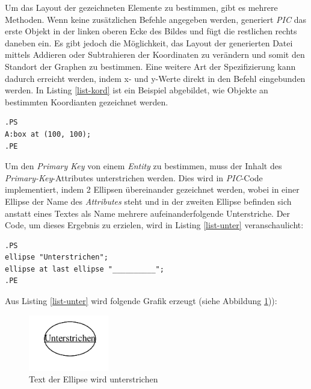 \pra
\noindent
Um das Layout der gezeichneten Elemente zu bestimmen, gibt es mehrere Methoden. Wenn keine zusätzlichen Befehle angegeben werden, generiert \textit{PIC} das erste Objekt in der linken oberen Ecke des Bildes und fügt die restlichen rechts daneben ein. Es gibt jedoch die Möglichkeit, das Layout der generierten Datei mittels Addieren oder Subtrahieren der Koordinaten zu verändern und somit den Standort der Graphen zu bestimmen. Eine weitere Art der Spezifizierung kann dadurch erreicht werden, indem x- und y-Werte direkt in den Befehl eingebunden werden. In Listing \ref{list-kord} ist ein Beispiel abgebildet, wie Objekte an bestimmten Koordianten gezeichnet werden.
\\

\noindent
\lstset{frame=lines}
\lstset{basicstyle=\footnotesize}
\begin{lstlisting}
.PS
A:box at (100, 100);
.PE
\end{lstlisting}

\noindent
Um den \textit{Primary Key} von einem \textit{Entity} zu bestimmen, muss der Inhalt des \textit{Primary-Key}-Attributes unterstrichen werden. Dies wird in \textit{PIC}-Code implementiert, indem 2 Ellipsen übereinander gezeichnet werden, wobei in einer Ellipse der Name des \textit{Attributes} steht und in der zweiten Ellipse befinden sich anstatt eines Textes als Name mehrere aufeinanderfolgende Unterstriche. Der Code, um dieses Ergebnis zu erzielen, wird in Listing \ref{list-unter} veranschaulicht:
\pra
\lstset{frame=lines}
\lstset{caption={PIC-Code zum Unterstreichen von Text in einer Ellipse]}}
\lstset{basicstyle=\footnotesize}
\begin{lstlisting}
.PS
ellipse "Unterstrichen";
ellipse at last ellipse "__________";
.PE
\end{lstlisting}

\noindent
Aus Listing \ref{list-unter} wird folgende Grafik erzeugt (siehe Abbildung \ref{Unterstrichen})):

\noindent
\begin{figure}[H]
	\begin{center}
		\includegraphics[width=3.5cm]{images/Ellipse_unterstrichen.png}
		\caption{Text der Ellipse wird unterstrichen}
		\label{Unterstrichen}
	\end{center}
\end{figure}

